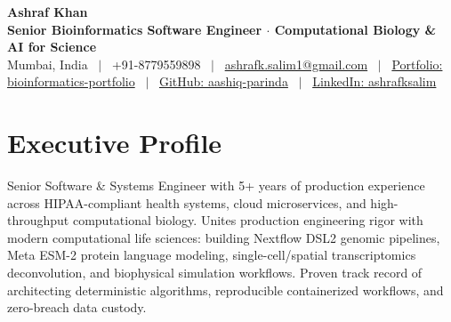 \documentclass[10pt,letterpaper]{article}
\begin{document}
\begin{center}
    {\Huge \textbf{\color{primary}Ashraf Khan}} \\ \vspace{2pt}
    {\large \textbf{Senior Bioinformatics Software Engineer $\cdot$ Computational Biology \& AI for Science}} \\ \vspace{3pt}
    \small
    Mumbai, India \ $|$ \ 
    +91-8779559898 \ $|$ \ 
    \href{mailto:ashrafk.salim1@gmail.com}{\color{accent}ashrafk.salim1@gmail.com} \ $|$ \ 
    \href{https://github.com/aashiq-parinda/bioinformatics-portfolio}{\color{accent}Portfolio: bioinformatics-portfolio} \ $|$ \ 
    \href{https://github.com/aashiq-parinda}{\color{accent}GitHub: aashiq-parinda} \ $|$ \ 
    \href{https://linkedin.com/in/ashrafksalim}{\color{accent}LinkedIn: ashrafksalim}
\end{center}
\vspace{-8pt}

\section{Executive Profile}
\vspace{2pt}
\small{
Senior Software \& Systems Engineer with 5+ years of production experience across HIPAA-compliant health systems, cloud microservices, and high-throughput computational biology. Unites production engineering rigor with modern computational life sciences: building Nextflow DSL2 genomic pipelines, Meta ESM-2 protein language modeling, single-cell/spatial transcriptomics deconvolution, and biophysical simulation workflows. Proven track record of architecting deterministic algorithms, reproducible containerized workflows, and zero-breach data custody.
}
\vspace{-4pt}

\end{document}
